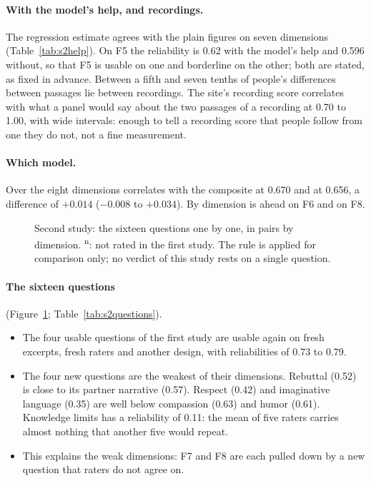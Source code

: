 \paragraph{With the model's help, and recordings.} The regression estimate agrees with the plain figures on
seven dimensions (Table~\ref{tab:s2help}). On F5 the reliability is 0.62 with the model's help and 0.596 without,
so that F5 is usable on one and borderline on the other; both are stated, as fixed in advance. Between a fifth
and seven tenths of people's differences between passages lie between recordings. The site's recording score
correlates with what a panel would say about the two passages of a recording at 0.70 to 1.00, with wide
intervals: enough to tell a recording score that people follow from one they do not, not a fine measurement.

\paragraph{Which model.} Over the eight dimensions \jev{} correlates with the composite at 0.670 and \drex{} at
0.656, a difference of $+0.014$ ($-0.008$ to $+0.034$). By dimension \jev{} is ahead on F6 and \drex{} on F8.

\begin{figure}[!htb]\centering

\caption{Second study: the sixteen questions one by one, in pairs by dimension. \textsuperscript{n}: not rated in
the first study. The rule is applied for comparison only; no verdict of this study rests on a single
question.}\label{fig:s2questions}
\end{figure}

\paragraph{The sixteen questions} (Figure~\ref{fig:s2questions}; Table~\ref{tab:s2questions}).
\begin{itemize}
\item The four usable questions of the first study are usable again on fresh excerpts, fresh raters and another
  design, with reliabilities of 0.73 to 0.79.
\item The four new questions are the weakest of their dimensions. Rebuttal (0.52) is close to its partner
  narrative (0.57). Respect (0.42) and imaginative language (0.35) are well below compassion (0.63) and humor
  (0.61). Knowledge limits has a reliability of 0.11: the mean of five raters carries almost nothing that
  another five would repeat.
\item This explains the weak dimensions: F7 and F8 are each pulled down by a new question that raters do not
  agree on.
\end{itemize}


